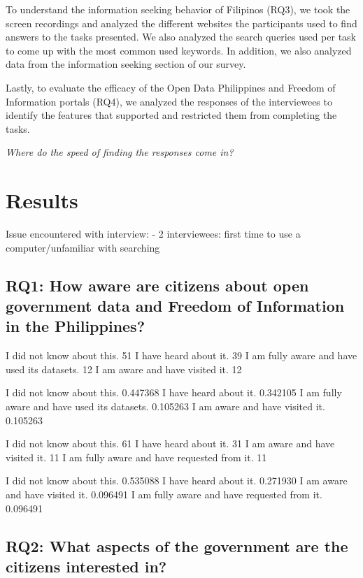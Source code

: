 \documentclass{sigchi}
\begin{document}
To understand the information seeking behavior of Filipinos (RQ3), we took the screen recordings and analyzed the different websites the participants used to find answers to the tasks presented. We also analyzed the search queries used per task to come up with the most common used keywords. In addition, we also analyzed data from the information seeking section of our survey.

Lastly, to evaluate the efficacy of the Open Data Philippines and Freedom of Information portals (RQ4), we analyzed the responses of the interviewees to identify the features that supported and restricted them from completing the tasks. 

\textit{Where do the speed of finding the responses come in?}


\section{Results}

Issue encountered with interview:
- 2 interviewees: first time to use a computer/unfamiliar with searching

\subsection{RQ1: How aware are citizens about open government data and Freedom of Information in the Philippines?}

I did not know about this.                      51
I have heard about it.                          39
I am fully aware and have used its datasets.    12
I am aware and have visited it.                 12

I did not know about this.                      0.447368
I have heard about it.                          0.342105
I am fully aware and have used its datasets.    0.105263
I am aware and have visited it.                 0.105263

I did not know about this.                      61
I have heard about it.                          31
I am aware and have visited it.                 11
I am fully aware and have requested from it.    11

I did not know about this.                      0.535088
I have heard about it.                          0.271930
I am aware and have visited it.                 0.096491
I am fully aware and have requested from it.    0.096491

\subsection{RQ2: What aspects of the government are the citizens interested in?}
\end{document}

